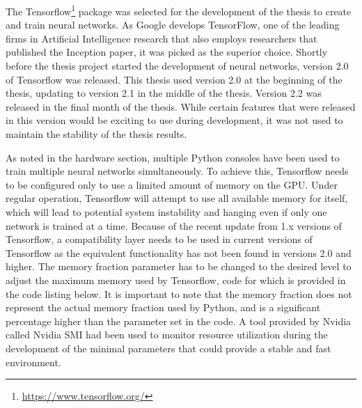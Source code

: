 The Tensorflow\footnote{\url{https://www.tensorflow.org/}} package was selected for the development of the thesis to create and train neural networks.
As Google develops TensorFlow, one of the leading firms in Artificial Intelligence research that also employs researchers that published the Inception paper\cite{szegedy2014going}, it was picked as the superior choice.
Shortly before the thesis project started the development of neural networks, version 2.0 of Tensorflow was released.
This thesis used version 2.0 at the beginning of the thesis, updating to version 2.1 in the middle of the thesis.
Version 2.2 was released in the final month of the thesis. 
While certain features that were released in this version would be exciting to use during development, it was not used to maintain the stability of the thesis results.

As noted in the hardware section, multiple Python consoles have been used to train multiple neural networks simultaneously.
To achieve this, Tensorflow needs to be configured only to use a limited amount of memory on the GPU.
Under regular operation, Tensorflow will attempt to use all available memory for itself, which will lead to potential system instability and hanging even if only one network is trained at a time.
Because of the recent update from 1.x versions of Tensorflow, a compatibility layer needs to be used in current versions of Tensorflow as the equivalent functionality has not been found in versions 2.0 and higher.
The memory fraction parameter has to be changed to the desired level to adjust the maximum memory used by Tensorflow, code for which is provided in the code listing below.
It is important to note that the memory fraction does not represent the actual memory fraction used by Python, and is a significant percentage higher than the parameter set in the code.
A tool provided by Nvidia called Nvidia SMI had been used to monitor resource utilization during the development of the minimal parameters that could provide a stable and fast environment.



